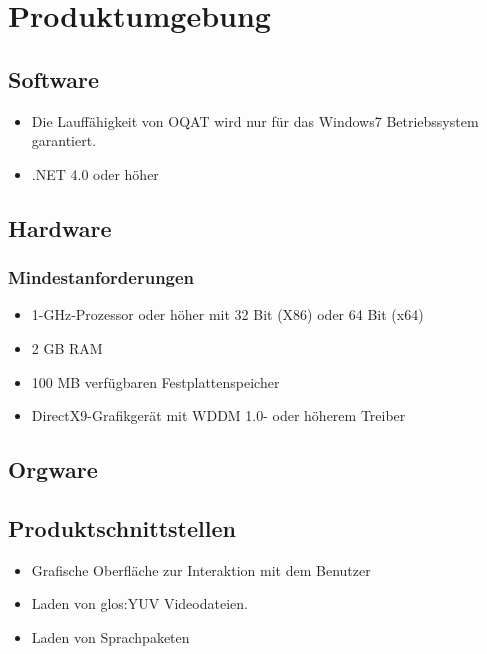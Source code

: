 \chapter{Produktumgebung}

\section{Software}
\begin{itemize}
\item Die Lauffähigkeit von \gls{OQAT} wird nur für das Windows7 Betriebssystem garantiert.
\item .NET 4.0 oder höher
\end{itemize}
\section{Hardware}
\subsection{Mindestanforderungen}
\begin{itemize}
\item 1-GHz-Prozessor oder höher mit 32 Bit (X86) oder 64 Bit (x64)
\item 2 GB RAM
\item 100 MB verfügbaren Festplattenspeicher 
\item DirectX9-Grafikgerät mit WDDM 1.0- oder höherem Treiber
\end{itemize}
\section{Orgware}
\section{Produktschnittstellen}
\begin{itemize}
\item Grafische Oberfläche zur Interaktion mit dem Benutzer
\item Laden von \gls{glos:YUV} Videodateien.
\item Laden von Sprachpaketen
\end{itemize}